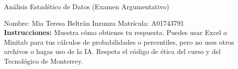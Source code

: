 \documentclass[8pt]{report}
\begin{document}
\newpage



\begin{center}
{An\'alisis Estad\'stico de Datos (Examen Argumentativo)}
\end{center}

Nombre: \underline{\hspace*{.2in}}
Mia Teresa Beltrán Inzunza
\underline{\hspace*{.2in}} \quad Matr\'icula:\underline{\hspace*{.2in}}
A01743791
\underline{\hspace*{.2in}} \\

{\bf Instrucciones:} Muestra c\'omo obtienes tu respuesta. Puedes usar Excel 
o Minitab para tus cálculos de probabilidades o 
percentiles, pero no uses otros archivos o hagas uso de la IA. Respeta el 
c\'odigo de \'etica del curso y del Tecnol\'ogico 
de Monterrey.
\end{document}
